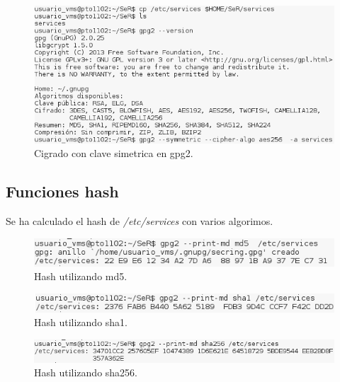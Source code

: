 \documentclass[11pt]{article}
\begin{document}
      \begin{figure}[!ht]
        \centering
        \includegraphics[width = \textwidth]{cipher_gpg2}
        \caption{Cigrado con clave simetrica en gpg2.}
      \end{figure}

    \subsection{Funciones hash}
      \par
      Se ha calculado el hash de \textit{/etc/services} con varios algorimos.

      \begin{figure}[!ht]
        \centering
        \includegraphics[width = .8\textwidth]{gpg2hash_md5}
        \caption{Hash utilizando md5.}
      \end{figure}

      \begin{figure}[!ht]
        \centering
        \includegraphics[width = .8\textwidth]{gpg2hash_sha1}
        \caption{Hash utilizando sha1.}
      \end{figure}

      \begin{figure}[!ht]
        \centering
        \includegraphics[width = .8\textwidth]{gpg2hash_sha256}
        \caption{Hash utilizando sha256.}
      \end{figure}
\end{document}
